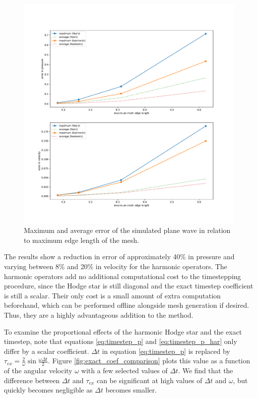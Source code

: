 \documentclass[utf8,english]{gradu3}
\begin{document}
\begin{figure}[h]
  \centering
  \includegraphics[width=350pt]{thesis/accuracy_test_errors.pdf}
  \caption{Maximum and average error of the simulated plane wave
  in relation to maximum edge length of the mesh.}
  \label{fig:accuracy_test_errors}
\end{figure}

The results show a reduction in error of approximately 40\% in pressure
and varying between 8\% and 20\% in velocity for the harmonic operators.
The harmonic operators add no additional computational cost to the timestepping procedure,
since the Hodge star is still diagonal and the exact timestep coefficient is still a scalar.
Their only cost is a small amount of extra computation beforehand,
which can be performed offline alongside mesh generation if desired.
Thus, they are a highly advantageous addition to the method.

To examine the proportional effects of the harmonic Hodge star and the exact timestep,
note that equations \eqref{eq:timestep_p} and \eqref{eq:timestep_p_har}
only differ by a scalar coefficient.
$\Delta t$ in equation \eqref{eq:timestep_p} is replaced by
$\tau_{ex} = \frac{2}{\omega} \sin \frac{\omega \Delta t}{2}$.
Figure \ref{fig:exact_coef_comparison} plots this value
as a function of the angular velocity $\omega$
with a few selected values of $\Delta t$.
We find that the difference between $\Delta t$ and $\tau_{ex}$
can be significant at high values of $\Delta t$ and $\omega$,
but quickly becomes negligible as $\Delta t$ becomes smaller.
\end{document}
